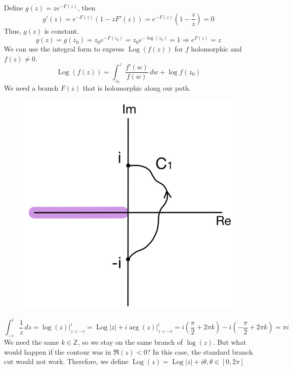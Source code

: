 \documentclass[11pt]{article}
\begin{document}
Define $g(z) = ze^{-F(z)}$, then
$$g'(z) = e^{-F(z)}(1 - zF'(z)) = e^{-F(z)}\left(1 - \frac{z}{z}\right) = 0$$
Thus, $g(z)$ is constant. 
$$g(z) = g(z_0) = z_0e^{-F(z_0)} = z_0 e^{-\operatorname{log}(z_0)} = 1 \Longrightarrow e^{F(z)} = z$$
\newpage
We can use the integral form to express $\operatorname{Log}(f(z))$ for $f$ holomorphic and $f(z) \neq 0$. 
$$ \operatorname{Log}(f(z)) = \int_{z_0}^z\frac{f'(w)}{f(w)}\, dw + \operatorname{log}f(z_0)$$
We need a branch $F(z)$ that is holomorphic along our path. 
\begin{figure}[H]
\includegraphics[scale = 0.17]{12_4}
\centering
\end{figure}
\vspace{-5mm}
$$ \int_{-i}^i \frac{1}{z} \, dz = \operatorname{log}(z) \bigg\rvert_{z = -i}^i = \operatorname{Log}|z| + i\operatorname{arg}(z)\bigg\rvert_{z = -i}^{i} = i\left(\frac{\pi}{2}+ 2\pi k\right) - i\left(-\frac{\pi}{2} + 2\pi k\right) = \pi i$$
We need the same $k \in \mathbb{Z}$, so we stay on the same branch of $\operatorname{log}(z)$. But what would happen if the contour was in $\Re(z) < 0$? In this case, the standard branch cut would not work. Therefore, we define $\operatorname{Log}(z) = \operatorname{Log}|z| + i\theta, \theta \in [0, 2\pi]$
\end{document}
